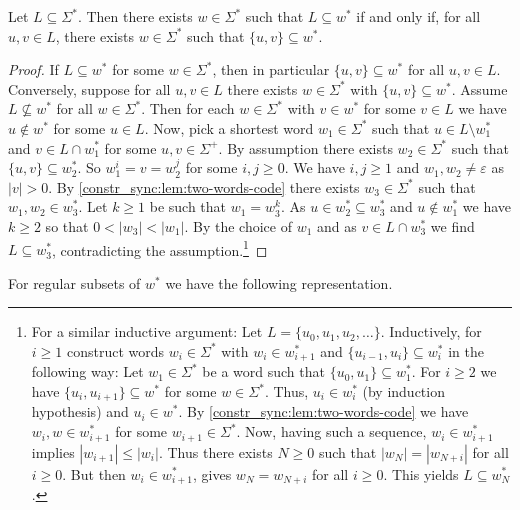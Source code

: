 \begin{proposition}\label{constrsync:prop:slender}
	Let $L \subseteq \Sigma^*$.
	Then there exists $w \in \Sigma^*$
	such that $L \subseteq w^*$
	if and only if, for all $u,v \in L$, there exists $w \in \Sigma^*$ such that $\{u,v\}\subseteq w^*$.
\end{proposition}
\begin{proof}
	If  $L \subseteq w^*$ for some $w \in \Sigma^*$,
	then in particular $\{u,v\} \subseteq w^*$ for all $u,v \in L$.	
	Conversely, suppose for all $u,v \in L$
	there exists $w \in \Sigma^*$ with $\{u,v\} \subseteq w^*$.
	Assume $L \not\subseteq w^*$ for all $w \in \Sigma^*$.
	Then for each $w \in \Sigma^*$
	with $v \in w^*$ for some $v \in L$
	we have $u \notin w^*$ for some $u \in L$.
	Now, pick a shortest word $w_1 \in \Sigma^*$  
	such that $u \in L \setminus w_1^*$
	and $v \in L \cap w_1^*$ for some $u,v \in \Sigma^+$.	
	By assumption there exists $w_2 \in \Sigma^*$
	such that $\{u, v\} \subseteq w_2^*$.
	So $w_1^i = v = w_2^j$ for some $i,j \ge 0$.
	We have	$i,j \ge 1$ and $w_1, w_2 \ne \varepsilon$ as~$|v| > 0$.
	By \cref{constr_sync:lem:two-words-code} there exists $w_3 \in \Sigma^*$
	such that $w_1, w_2 \in w_3^*$.
	Let $k \ge 1$ be such that $w_1 = w_3^k$.
	As $u \in w_2^* \subseteq w_3^*$ and $u \notin w_1^*$
	we have $k \ge 2$ so that $0 < |w_3| < |w_1|$.
	By the choice of $w_1$ and as $v \in L \cap w_3^*$ we find $L \subseteq w_3^*$, contradicting the 
	assumption.\footnote{For a similar inductive argument: Let $L = \{u_0, u_1, u_2, \ldots \}$.
		Inductively, for $i \ge 1$
		construct words $w_i \in \Sigma^*$
		with $w_i \in w_{i+1}^*$ and $\{u_{i-1},u_i\} \subseteq w_i^*$
		in the following way:
		Let $w_1 \in \Sigma^*$
		be a word such that $\{u_0, u_1\} \subseteq w_1^*$.
		For $i \ge 2$ we have $\{u_i, u_{i+1}\} \subseteq w^*$ 
		for some $w \in \Sigma^*$.
		Thus, $u_i \in w_i^*$ (by induction hypothesis) and $u_i \in w^*$.
		By \cref{constr_sync:lem:two-words-code} 
		we have $w_i, w \in w_{i+1}^*$ for some $w_{i+1} \in \Sigma^*$.
		Now, having such a sequence, $w_i \in w_{i+1}^*$
		implies $|w_{i+1}| \le |w_i|$.
		Thus there exists $N \ge 0$ such that $|w_N| = |w_{N+i}|$ for all $i \ge 0$.
		But then $w_i \in w_{i+1}^*$,
		gives $w_N = w_{N+i}$ for all $i \ge 0$.
		This yields $L \subseteq w_N^*$.}
\end{proof}

For regular subsets of $w^*$ we have the following representation.


